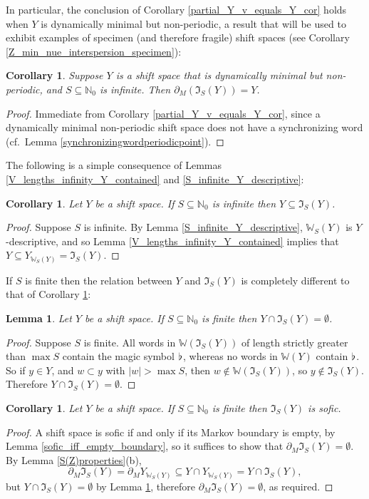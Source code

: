 \documentclass[reqno,11pt]{amsart}
\newtheorem{lem}[thm]{Lemma}
\newtheorem{cor}[thm]{Corollary}
\theoremstyle{definition}
\theoremstyle{remark}
\theoremstyle{remark}
\def \N {\mathbb N}
\def\w{\mathbb{W}}
\def\i{\mathfrak{I}}
\def\b{\kern 0.02em \flat \kern 0.02em}
\numberwithin{equation}{section}
\begin{document}
In particular, the conclusion of Corollary \ref{partial_Y_v_equals_Y_cor} holds
when $Y$ is dynamically minimal but non-periodic, a result that will be used 
to exhibit examples of specimen (and therefore fragile) shift spaces (see Corollary \ref{Z_min_nue_interspersion_specimen}):

\begin{cor}\label{boundary_S_equals_Y}
Suppose $Y$ is a shift space that  is dynamically minimal but non-periodic,
and $S\subseteq\N_0$ is infinite.
Then $\partial_M( \i_S(Y))=Y$.
\end{cor}
\begin{proof}
Immediate from  Corollary \ref{partial_Y_v_equals_Y_cor}, since a dynamically minimal non-periodic shift space does not have a synchronizing word (cf.~Lemma \ref{synchronizingwordperiodicpoint}).
\end{proof}


The following is a simple consequence of  Lemmas \ref{V_lengths_infinity_Y_contained} and \ref{S_infinite_Y_descriptive}:

\begin{cor}\label{length_constrained_S_infinite_finite}
Let $Y$ be a shift space.
If $S\subseteq\N_0$ is infinite then $Y \subseteq \i_S(Y)$.
\end{cor}
\begin{proof}
Suppose $S$ is infinite.
By Lemma \ref{S_infinite_Y_descriptive},
 $\w_S(Y)$ is $Y$-descriptive, and so
 Lemma \ref{V_lengths_infinity_Y_contained} implies that $Y \subseteq Y_{\w_S(Y)}= \i_S(Y)$.
\end{proof}

 
If  $S$ is finite then
the relation between
$Y$ and $\i_S(Y)$
is completely different to that of Corollary \ref{length_constrained_S_infinite_finite}:

\begin{lem}\label{S_finite_disjoint}
Let $Y$ be a shift space.
If $S\subseteq\N_0$ is finite then $Y\cap\i_S(Y)=\emptyset$.
\end{lem}
\begin{proof}
Suppose $S$ is finite.
All words in $\w(\i_S(Y))$ of length strictly greater than $\max S$ contain the magic symbol $\b$, whereas no words in $\w(Y)$ contain $\b$.
So if $y\in Y$, and $w\subset y$ with $|w|>\max S$, then $w\notin \w(\i_S(Y))$, so $y\notin \i_S(Y)$.
Therefore $Y\cap\i_S(Y)=\emptyset$.
\end{proof}

\begin{cor}\label{S_finite_sofic}
Let $Y$ be a shift space.
If $S\subseteq\N_0$ is finite then $\i_S(Y)$ is sofic.
\end{cor}
\begin{proof}
A shift space is sofic if and only if its Markov boundary is empty, by
Lemma \ref{sofic_iff_empty_boundary}, so it suffices to show that $\partial_M  \i_S(Y) = \emptyset$.
By Lemma \ref{S(Z)properties}(b),
$$\partial_M  \i_S(Y)
= \partial_M Y_{\w_S(Y)}
\subseteq Y \cap Y_{\w_S(Y)}
= Y \cap \i_S(Y),
$$
but $Y\cap\i_S(Y)=\emptyset$
by Lemma \ref{S_finite_disjoint},
therefore $\partial_M  \i_S(Y) =\emptyset$, as required.
\end{proof}
\end{document}
